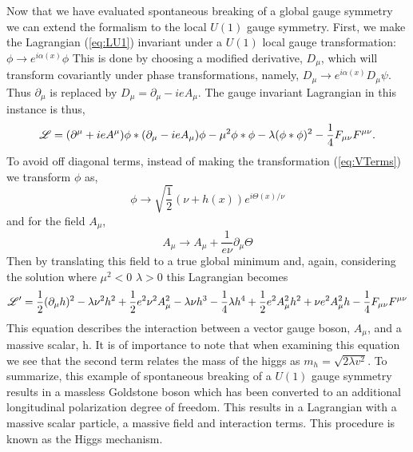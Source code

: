 Now that we have evaluated spontaneous breaking of 
a global gauge symmetry we can extend the formalism to the local $U(1)$ gauge symmetry.
First, we make the Lagrangian (\ref{eq:LU1}) invariant under a $U(1)$ 
local gauge transformation: $\phi\rightarrow e^{i\alpha(x)}\phi$
This is done by choosing a modified derivative, $D_{\mu}$, which will
transform covariantly under phase transformations, namely, 
$D_{\mu}\rightarrow e^{i\alpha(x)}D_{\mu}\psi$. Thus $\partial_{\mu}$
is replaced by $D_{\mu} = \partial_{\mu}-ieA_{\mu}$.
The gauge invariant Lagrangian in this instance is thus,
\begin{equation}
\mathscr{L}=(\partial^{\mu}+ieA^{\mu})\phi*(\partial_{\mu}-ieA_{\mu})\phi - \mu^{2} \phi*\phi - \lambda(\phi*\phi)^{2}-\frac{1}{4}F_{\mu\nu}F^{\mu\nu}.
\end{equation}
To avoid off diagonal terms, instead of making the transformation (\ref{eq:VTerms})
we transform $\phi$ as,
\begin{equation}
\phi\rightarrow\sqrt{\frac{1}{2}}(\nu+h(x))e^{i\Theta(x)/\nu}
\end{equation}
and for the field $A_{\mu}$,
\begin{equation}
A_{\mu}\rightarrow A_{\mu}+\frac{1}{e\nu}\partial_{\mu}\Theta
\end{equation}
Then by translating this field to a true global minimum
and, again, considering the solution where $\mu^{2}<0$ $\lambda>0$ this Lagrangian becomes 
\begin{equation}
\mathscr{L}'=\frac{1}{2}(\partial_{\mu}h)^{2}-\lambda \nu^{2}h^{2}+\frac{1}{2}e^{2}\nu^{2}A_{\mu}^{2}-\lambda\nu h^{3}-
\frac{1}{4}\lambda h^{4} + \frac{1}{2}e^{2}A_{\mu}^{2}h^{2}+\nu e^{2}A_{\mu}^{2}h-\frac{1}{4}F_{\mu\nu}F^{\mu\nu}
\end{equation}
This equation describes the interaction between a vector gauge boson,
$A_{\mu}$, and a massive scalar, h. 
It is of importance to note that when examining this equation 
we see that the second term relates the mass 
of the higgs as $m_{h}=\sqrt{2\lambda v^{2}}$. 
To summarize, this example of spontaneous breaking of a $U(1)$ gauge symmetry
results in a massless Goldstone boson which has been converted to an
additional longitudinal polarization degree of freedom. This results
in a Lagrangian with a massive scalar particle, a massive field and interaction terms.
This procedure is known as the Higgs mechanism. 

